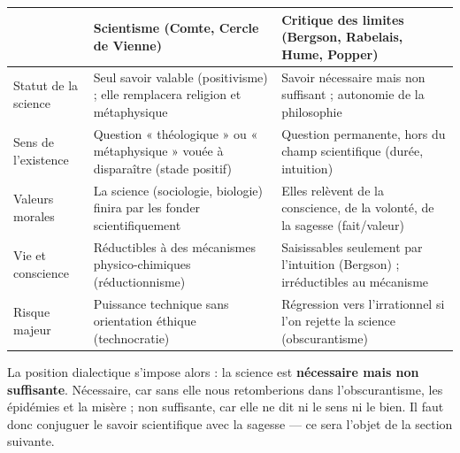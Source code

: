 \documentclass[11pt]{article}
\begin{document}
\begin{center}
\begin{tabularx}{\linewidth}{|l|X|X|}
\hline
\rowcolor{popblueL} & \textbf{Scientisme (Comte, Cercle de Vienne)} & \textbf{Critique des limites (Bergson, Rabelais, Hume, Popper)} \\
\hline
Statut de la science & Seul savoir valable (positivisme) ; elle remplacera religion et métaphysique & Savoir nécessaire mais non suffisant ; autonomie de la philosophie \\
\hline
Sens de l'existence & Question « théologique » ou « métaphysique » vouée à disparaître (stade positif) & Question permanente, hors du champ scientifique (durée, intuition) \\
\hline
Valeurs morales & La science (sociologie, biologie) finira par les fonder scientifiquement & Elles relèvent de la conscience, de la volonté, de la sagesse (fait/valeur) \\
\hline
Vie et conscience & Réductibles à des mécanismes physico-chimiques (réductionnisme) & Saisissables seulement par l'intuition (Bergson) ; irréductibles au mécanisme \\
\hline
Risque majeur & Puissance technique sans orientation éthique (technocratie) & Régression vers l'irrationnel si l'on rejette la science (obscurantisme) \\
\hline
\end{tabularx}
\end{center}

La position dialectique s'impose alors : la science est \textbf{nécessaire mais non suffisante}. Nécessaire, car sans elle nous retomberions dans l'obscurantisme, les épidémies et la misère ; non suffisante, car elle ne dit ni le sens ni le bien. Il faut donc conjuguer le savoir scientifique avec la sagesse — ce sera l'objet de la section suivante.
\end{document}

